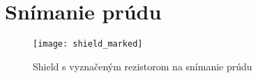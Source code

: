 \chapter{Snímanie prúdu}

\begin{figure}[h]
\centering
\texttt{[image: shield\_marked]}
\caption{Shield s vyznačeným rezistorom na snímanie prúdu}
\label{fig:currentSensor}
\end{figure}